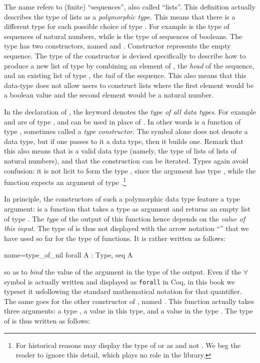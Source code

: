 The name  refers to (finite) ``sequences'', also called
``lists''. This definition actually describes the type
of lists as a {\em polymorphic type}. This means that there is a
different type  for each possible choice of type .  For example
 is the type of sequences of natural numbers, while
 is the type of sequences of booleans.
The type  has two
constructors, named  and . Constructor 
represents the empty sequence. The type of the
constructor  is devised specifically to describe how to produce a
new list of type  by combining an element of , the
\emph{head} of the sequence, and an
existing list of type , the \emph{tail} of the sequence.  This
also means that this data-type
does not allow users to construct lists where the first element would be
a boolean value and the second element would be a natural number.

In the declaration of , the keyword  denotes the
\emph{type of all data types}.  For example  and  are of type
, and can be used in place of .
In other words  is a function of type , sometimes
called a \emph{type constructor}.  The symbol  alone does not
denote a data type,
but if one passes to it a data type, then it builds one.  Remark
that this also means that  is a valid data type
(namely, the type of lists of lists of natural numbers), and
that the construction can be iterated.
Types again avoid confusion: it is not licit to form the type ,
since the argument  has type , while the function
 expects an argument of type .\footnote{For historical
reasons \Coq{} may display the type of  or  as 
and not .  We beg the reader to ignore this detail, which
plays no role in the \mcbMC{} library.}

In principle, the constructors of such a polymorphic data type feature
a type argument:
 is a function that takes a type  as argument and returns
an empty list of type . The \emph{type} of the output of
this function hence depends on the \emph{value of this input}. The
type of  is thus not displayed with the arrow notation
``'' that we have used so far for the type of
functions. It is rather written as follows:

\begin{coq}{name=type_of_nil}{}
  forall A : Type, seq A
\end{coq}
so as to \emph{bind} the value  of the argument in the type of
the output. Even if the $\forall$ symbol is actually written and displayed as
\verb+forall+ in Coq, in this book we typeset it usfollowing the standard
mathematical notation for that quantifier.
The same goes for the other constructor of , named
.  This function actually takes three arguments: a type ,
a value in this type, and a value in the type .  The type
of  is thus written as follows:

